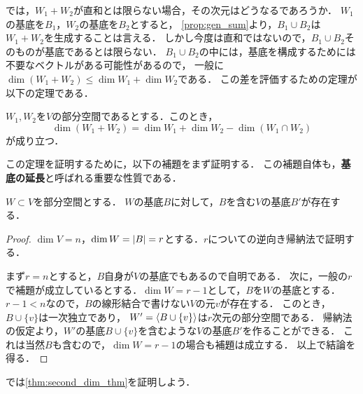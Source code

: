 では，$W_1 + W_2$が直和とは限らない場合，その次元はどうなるであろうか．
$W_1$の基底を$B_1$，$W_2$の基底を$B_2$とすると，
\cref{prop:gen_sum}より，$B_1 \cup B_2$は$W_1 + W_2$を生成することは言える．
しかし今度は直和ではないので，$B_1 \cup B_2$そのものが基底であるとは限らない．
$B_1 \cup B_2$の中には，基底を構成するためには不要なベクトルがある可能性があるので，
一般に$\dim (W_1 + W_2) \le \dim W_1 + \dim W_2$である．
この差を評価するための定理が以下の定理である．
\begin{thm}\label{thm:second_dim_thm}
  $W_1,W_2$を$V$の部分空間であるとする．このとき，
  \begin{equation}
    \dim (W_1 + W_2) = \dim W_1 + \dim W_2 - \dim (W_1 \cap W_2)
  \end{equation}
  が成り立つ．
\end{thm}
この定理を証明するために，以下の補題をまず証明する．
この補題自体も，\textbf{基底の延長}と呼ばれる重要な性質である．
\begin{lemma}
  $W \subset V$を部分空間とする．
  $W$の基底$B$に対して，$B$を含む$V$の基底$B'$が存在する．
\end{lemma}
\begin{proof}
  $\dim V = n$，$\dim W = \left|B\right| = r$とする．$r$についての逆向き帰納法で証明する．

  まず$r=n$とすると，$B$自身が$V$の基底でもあるので自明である．
  次に，一般の$r$で補題が成立しているとする．$\dim W = r - 1$として，$B$を$W$の基底とする．
  $r-1 < n$なので，$B$の線形結合で書けない$V$の元$v$が存在する．
  このとき，$B \cup \{v\}$は一次独立であり，
  $W' = \left\langle B \cup \{v\} \right\rangle$は$r$次元の部分空間である．
  帰納法の仮定より，$W'$の基底$B \cup \{v\}$を含むような$V$の基底$B'$を作ることができる．
  これは当然$B$も含むので，$\dim W = r-1$の場合も補題は成立する．
  以上で結論を得る．
\end{proof}
では\cref{thm:second_dim_thm}を証明しよう．

